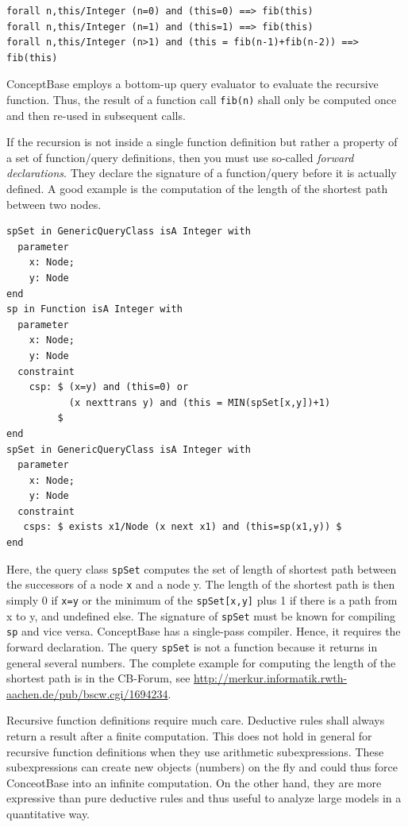 {\small
\begin{verbatim}
forall n,this/Integer (n=0) and (this=0) ==> fib(this)
forall n,this/Integer (n=1) and (this=1) ==> fib(this)
forall n,this/Integer (n>1) and (this = fib(n-1)+fib(n-2)) ==> fib(this)
\end{verbatim}
}

ConceptBase employs a bottom-up query evaluator to evaluate the recursive function.
Thus, the result of a function call {\tt fib(n)} shall only be computed once and then
re-used in subsequent calls.

If the recursion is not inside a single function definition but rather a property of a set
of function/query definitions, then you must use so-called {\em forward declarations}. They
declare the signature of a function/query before it is actually defined. A good example is
the computation of the length of the shortest path between two nodes.

{\small
\begin{verbatim}
spSet in GenericQueryClass isA Integer with
  parameter
    x: Node;
    y: Node
end
sp in Function isA Integer with
  parameter
    x: Node;
    y: Node
  constraint
    csp: $ (x=y) and (this=0) or
           (x nexttrans y) and (this = MIN(spSet[x,y])+1)
         $
end
spSet in GenericQueryClass isA Integer with
  parameter
    x: Node;
    y: Node
  constraint
   csps: $ exists x1/Node (x next x1) and (this=sp(x1,y)) $
end
\end{verbatim}
}

Here, the query class {\tt spSet} computes the set of length of shortest path between
the successors of a node {\tt x} and a node {y}. The length of the shortest path is then
simply 0 if {\tt x=y} or the minimum of the {\tt spSet[x,y]} plus 1 if there is a path from
x to y, and undefined else.
The signature of {\tt spSet} must be known for compiling {\tt sp} and vice versa. ConceptBase
has a single-pass compiler. Hence, it requires the forward declaration. The query
{\tt spSet} is not a function because it returns in general several numbers.
The complete example for computing the length of the shortest path is in the
CB-Forum, see \url{http://merkur.informatik.rwth-aachen.de/pub/bscw.cgi/1694234}.

Recursive function definitions require much care. Deductive rules shall always return
a result after a finite computation. This does not hold in general for recursive
function definitions when they use arithmetic subexpressions. These subexpressions
can create new objects (numbers) on the fly and could thus force ConceotBase into an
infinite computation. On the other hand, they are more expressive than pure
deductive rules and thus useful to analyze large models in a quantitative way.


